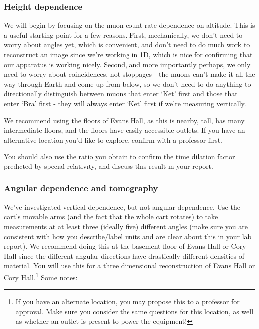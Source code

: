 \documentclass{../lab}
\begin{document}

\subsubsection{Height dependence}

We will begin by focusing on the muon count rate dependence on altitude. This is a useful starting point for a few reasons. First, mechanically, we don't need to worry about angles yet, which is convenient, and don't need to do much work to reconstruct an image since we're working in 1D, which is nice for confirming that our apparatus is working nicely. Second, and more importantly perhaps, we only need to worry about coincidences, not stoppages - the muons can't make it all the way through Earth and come up from below, so we don't need to do anything to directionally distinguish between muons that enter `Ket' first and those that enter `Bra' first - they will always enter `Ket' first if we're measuring vertically.


We recommend using the floors of Evans Hall, as this is nearby, tall, has many intermediate floors, and the floors have easily accessible outlets. If you have an alternative location you'd like to explore, confirm with a professor first.


You should also use the ratio you obtain to confirm the time dilation factor predicted by special relativity, and discuss this result in your report.

\subsubsection{Angular dependence and tomography}

We've investigated vertical dependence, but not angular dependence. Use the cart's movable arms (and the fact that the whole cart rotates) to take measurements at at least three (ideally five) different angles (make sure you are consistent with how you describe/label units and are clear about this in your lab report). We recommend doing this at the basement floor of Evans Hall or Cory Hall since the different angular directions have drastically different densities of material. You will use this for a three dimensional reconstruction of Evans Hall or Cory Hall.\footnote{If you have an alternate location, you may propose this to a professor for approval. Make sure you consider the same questions for this location, as well as whether an outlet is present to power the equipment!} Some notes:
\end{document}
